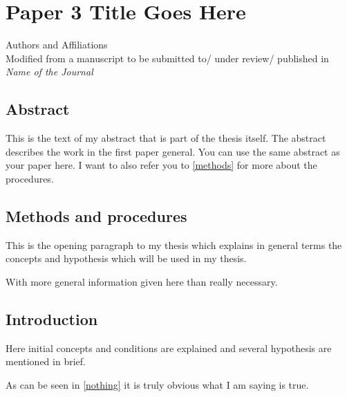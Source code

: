 \chapter{Paper 3 Title Goes Here}

\begin{center}
    Authors and Affiliations \\
    Modified from a manuscript to be submitted to/ under review/ published in \textit{Name of the Journal}
\end{center}

\section{Abstract}
This is the text of my abstract that is part of the thesis itself.
The abstract describes the work in the first paper general. You can use the same abstract as your paper here.
I want to also refer you to \autoref{methods} for more about the procedures.


\section{Methods and procedures}
\label{methods}

This is the opening paragraph to my thesis which
explains in general terms the concepts and hypothesis
which will be used in my thesis.

With more general information given here than really
necessary.

\section{Introduction}

Here initial concepts and conditions are explained and
several hypothesis are mentioned in brief.

As can be seen in \autoref{nothing} it is truly
obvious what I am saying is true.

